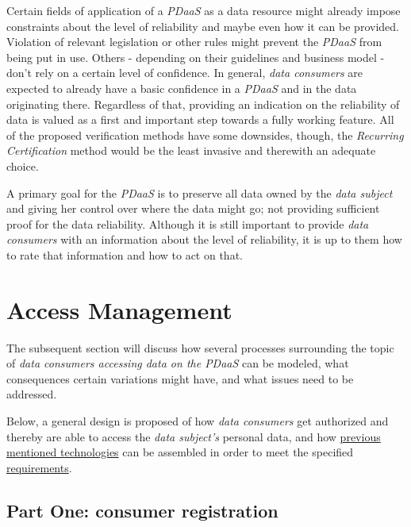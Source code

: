 \documentclass[12pt,english,a4paper,titlepage,cleardoublepage=empty,dottedtoc]{report}
\begin{document}
Certain fields of application of a \emph{PDaaS} as a data resource might
already impose constraints about the level of reliability and maybe even
how it can be provided. Violation of relevant legislation or other rules
might prevent the \emph{PDaaS} from being put in use. Others - depending
on their guidelines and business model - don't rely on a certain level
of confidence. In general, \emph{data consumers} are expected to already
have a basic confidence in a \emph{PDaaS} and in the data originating
there. Regardless of that, providing an indication on the reliability of
data is valued as a first and important step towards a fully working
feature. All of the proposed verification methods have some downsides,
though, the \emph{Recurring Certification} method would be the least
invasive and therewith an adequate choice.

A primary goal for the \emph{PDaaS} is to preserve all data owned by the
\emph{data subject} and giving her control over where the data might go;
not providing sufficient proof for the data reliability. Although it is
still important to provide \emph{data consumers} with an information
about the level of reliability, it is up to them how to rate that
information and how to act on that.

\section{Access Management}\label{access-management}

The subsequent section will discuss how several processes surrounding
the topic of \emph{data consumers accessing data on the PDaaS} can be
modeled, what consequences certain variations might have, and what
issues need to be addressed.

Below, a general design is proposed of how \emph{data consumers} get
authorized and thereby are able to access the \emph{data subject's}
personal data, and how
\protect\hyperlink{standards-specifications-and-related-technologies}{previous
mentioned technologies} can be assembled in order to meet the specified
\protect\hyperlink{requirements}{requirements}.

\subsection*{Part One: consumer
registration}\label{part-one-consumer-registration}
\end{document}
